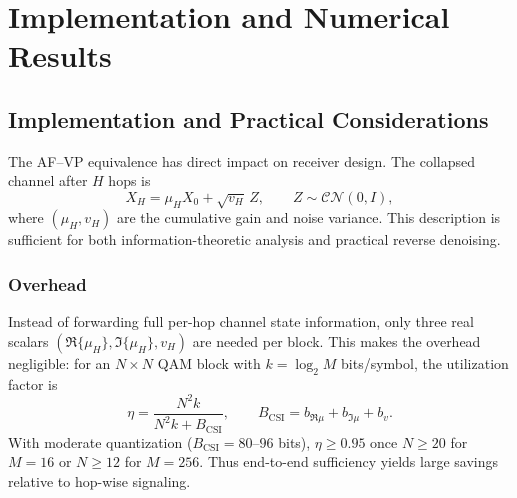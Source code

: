 \documentclass[journal]{IEEEtran}
\begin{document}



\section{Implementation and Numerical Results}
\subsection{Implementation and Practical Considerations}
\label{sec:implementation}

The AF--VP equivalence has direct impact on receiver design. 
The collapsed channel after $H$ hops is 
\[
X_H = \mu_H X_0 + \sqrt{v_H}\,Z,\qquad Z\sim\mathcal{CN}(0,I),
\]
where $(\mu_H,v_H)$ are the cumulative gain and noise variance. 
This description is sufficient for both information-theoretic analysis 
and practical reverse denoising.

\subsubsection{Overhead}

Instead of forwarding full per-hop channel state information, only three real scalars 
$(\Re\{\mu_H\},\Im\{\mu_H\},v_H)$ are needed per block. 
This makes the overhead negligible: for an $N\times N$ QAM block with 
$k=\log_2 M$ bits/symbol, the utilization factor is
\[
\eta=\frac{N^2 k}{N^2 k + B_{\text{CSI}}},\qquad 
B_{\text{CSI}}=b_{\Re\mu}+b_{\Im\mu}+b_v.
\]
With moderate quantization ($B_{\text{CSI}}=80$--$96$ bits), 
$\eta\ge0.95$ once $N\ge 20$ for $M=16$ or $N\ge 12$ for $M=256$. 
Thus end-to-end sufficiency yields large savings relative to hop-wise signaling.
\end{document}

